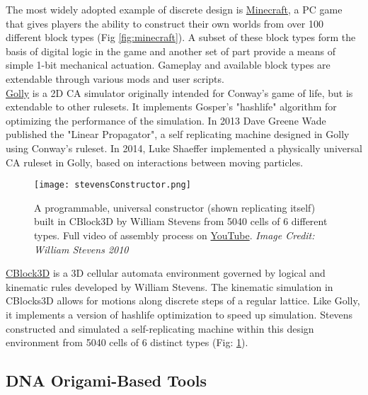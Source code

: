 {The most widely adopted example of discrete design is \href{https://minecraft.net/}{Minecraft}, a PC game that gives players the ability to construct their own worlds from over 100 different block types (Fig \ref{fig:minecraft}).  A subset of these block types form the basis of digital logic in the game and another set of part provide a means of simple 1-bit mechanical actuation\cite{MinecraftWik2016}.  Gameplay and available block types are extendable through various mods and user scripts.
\\

\href{http://golly.sourceforge.net/}{Golly} is a 2D CA simulator originally intended for Conway's game of life, but is extendable to other rulesets.  It implements Gosper's "hashlife" algorithm for optimizing the performance of the simulation\cite{Gosper1984}.  In 2013 Dave Greene Wade published the "Linear Propagator", a self replicating machine designed in Golly using Conway's ruleset\cite{Greene2013a}.  In 2014, Luke Shaeffer implemented a physically universal CA ruleset in Golly, based on interactions between moving particles\cite{Shaffer2014}.\\

\begin{figure}
  \texttt{[image: stevensConstructor.png]}
  \caption{A programmable, universal constructor (shown replicating itself) built in CBlock3D by William Stevens from 5040 cells of 6 different types\cite{Stevens2009b}.  Full video of assembly process on  \href{https://www.youtube.com/watch?v=PBXO_6Jn1fs}{YouTube}. \textit{Image Credit: William Stevens 2010}}
  \label{fig:stevensConstructor}
\end{figure}
\href{https://www.youtube.com/watch?feature=player_embedded&v=PBXO_6Jn1fs}{CBlock3D} is a 3D cellular automata environment governed by logical and kinematic rules developed by William Stevens\cite{Stevens2007}\cite{Stevens2009}.  The kinematic simulation in CBlocks3D allows for motions along discrete steps of a regular lattice.  Like Golly, it implements a version of hashlife optimization\cite{Stevens2010} to speed up simulation.  Stevens constructed and simulated a self-replicating machine within this design environment from 5040 cells of 6 distinct types (Fig: \ref{fig:stevensConstructor})\cite{Stevens2009b}.
\\

\subsection{DNA Origami-Based Tools}

}
